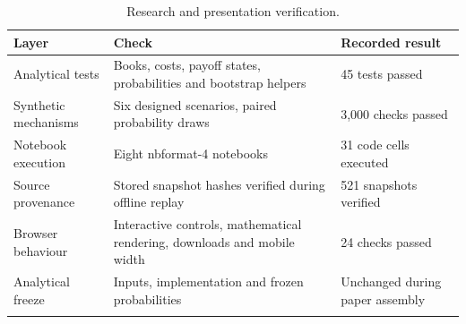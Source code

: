 \begin{table}[htbp]\centering
{\fontsize{10}{12}\selectfont\renewcommand{\arraystretch}{1.18}\setlength{\tabcolsep}{4pt}
\begin{tabularx}{\linewidth}{@{}L{31mm}L{88mm}X@{}}\toprule{}
\textbf{Layer} & \textbf{Check} & \textbf{Recorded result} \\ \midrule
Analytical tests & Books, costs, payoff states, probabilities and bootstrap helpers & 45 tests passed \\ \hline
Synthetic mechanisms & Six designed scenarios, paired probability draws & 3,000 checks passed \\ \hline
Notebook execution & Eight nbformat-4 notebooks & 31 code cells executed \\ \hline
Source provenance & Stored snapshot hashes verified during offline replay & 521 snapshots verified \\ \hline
Browser behaviour & Interactive controls, mathematical rendering, downloads and mobile width & 24 checks passed \\ \hline
Analytical freeze & Inputs, implementation and frozen probabilities & Unchanged during paper assembly \\ \hline
{}\bottomrule\end{tabularx}}
\caption[Research and presentation verification]{Research and presentation verification.}\label{tab:validation}
\end{table}

